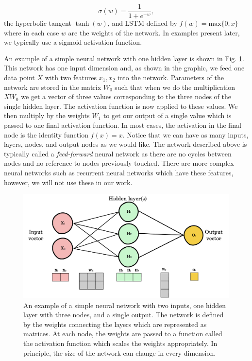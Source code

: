 \documentclass{CUP-JNL-DTM}%
\theoremstyle{definition}
\numberwithin{equation}{section}
\begin{document}
\begin{equation}
    \sigma(w) = \frac{1}{1 + e^{-w}},
\end{equation}
the hyperbolic tangent $\tanh(w)$, and LSTM defined by $f(w) = \textrm{max}\{0,x\}$ where in each case $w$ are the weights of the network. In examples present later, we typically use a sigmoid activation function. 

An example of a simple neural network with one hidden layer is shown in Fig. \ref{fig:NNexample}. This network has one input dimension and, as shown in the graphic, we feed one data point $X$ with two features $x_1, x_2$ into the network. Parameters of the network are stored in the matrix $W_0$ such that when we do the multiplication $X W_0$ we get a vector of three values corresponding to the three nodes of the single hidden layer. The activation function is now applied to these values. We then multiply by the weights $W_1$ to get our output of a single value which is passed to one final activation function. In most cases, the activation in the final node is the identity function $f(x) = x$. Notice that we can have as many inputs, layers, nodes, and output nodes as we would like. The network described above is typically called a \emph{feed-forward} neural network as there are no cycles between nodes and no reference to nodes previously touched. There are more complex neural networks such as recurrent neural networks which have these features, however, we will not use these in our work.

\begin{figure}
\centering
\includegraphics[width=0.7\linewidth]{figures/NN_example.png}
\caption{An example of a simple neural network with two inputs, one hidden layer with three nodes, and a single output. The network is defined by the weights connecting the layers which are represented as matrices. At each node, the weights are passed to a function called the activation function which scales the weights appropriately. In principle, the size of the network can change in every dimension. }
\label{fig:NNexample}
\end{figure}
\end{document}
